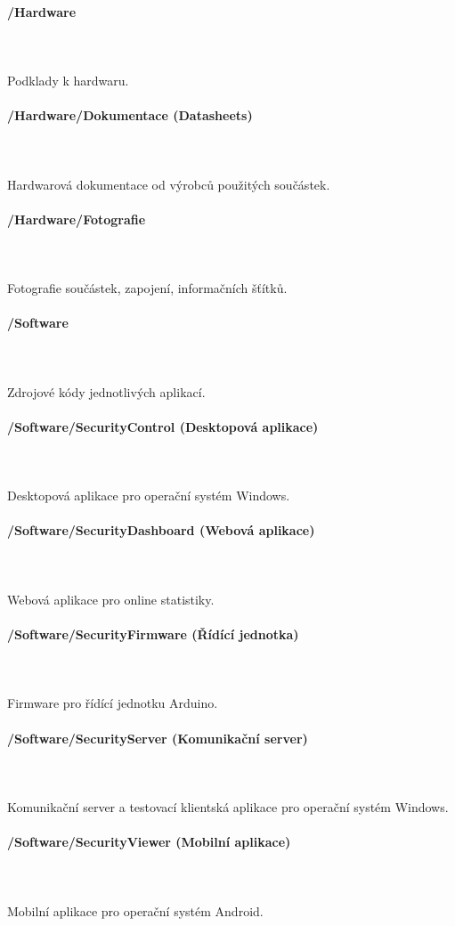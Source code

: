 \documentclass[FM,DP]{tulthesis}  %
\begin{document}
\paragraph{/Hardware}\mbox{}\\\mbox{}\\
Podklady k hardwaru.

\paragraph{/Hardware/Dokumentace (Datasheets)}\mbox{}\\\mbox{}\\
Hardwarová dokumentace od výrobců použitých součástek.

\paragraph{/Hardware/Fotografie}\mbox{}\\\mbox{}\\
Fotografie součástek, zapojení, informačních šťítků.

\paragraph{/Software}\mbox{}\\\mbox{}\\
Zdrojové kódy jednotlivých aplikací.

\paragraph{/Software/SecurityControl (Desktopová aplikace)}\mbox{}\\\mbox{}\\
Desktopová aplikace pro operační systém Windows.

\paragraph{/Software/SecurityDashboard (Webová aplikace)}\mbox{}\\\mbox{}\\
Webová aplikace pro online statistiky.

\paragraph{/Software/SecurityFirmware (Řídící jednotka)}\mbox{}\\\mbox{}\\
Firmware pro řídící jednotku Arduino.

\paragraph{/Software/SecurityServer (Komunikační server)}\mbox{}\\\mbox{}\\
Komunikační server a testovací klientská aplikace pro operační systém Windows.

\paragraph{/Software/SecurityViewer (Mobilní aplikace)}\mbox{}\\\mbox{}\\
Mobilní aplikace pro operační systém Android.
\end{document}
